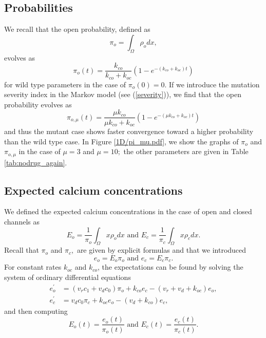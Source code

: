 \subsection{Probabilities}

We recall that the open probability, defined as
\begin{equation}
\pi_{o}=\int_{\Omega}\rho_{o}dx, \label{open100}
\end{equation}
evolves as%
\begin{equation}
\pi_{o}(t)=\frac{k_{co}}{k_{co}+k_{oc}}\left(  1-e^{-\left(  k_{co}%
+k_{oc}\right)  t}\right)
\end{equation}
for wild type parameters in the case of $\pi_{o}(0)=0$. If we introduce the mutation severity index in the
Markov model (see (\ref{severity})), we find that the open probability evolves as%
\begin{equation}
\pi_{o,\mu}(t)=\frac{\mu k_{co}}{\mu k_{co}+k_{oc}}\left(  1-e^{-\left(  \mu
k_{co}+k_{oc}\right)  t}\right)
\end{equation}
and thus the mutant case shows faster convergence toward a higher probability
than the wild type case. In Figure \ref{1D/pi_mu.pdf}, we show the graphs of $\pi_{o}$ and
$\pi_{o,\mu}$ in the case of $\mu=3$ and $\mu=10;$ the other parameters are given in Table \ref{tab:nodrug_again}.

\bigskip


\subsection{Expected calcium concentrations}

We defined the expected calcium concentrations in the case of open and
closed channels as
\begin{equation}
E_{o}=\frac{1}{\pi_{o}}\int_{\Omega}x\rho_{o}dx\text{ and }E_{c}=\frac{1}%
{\pi_{c}}\int_{\Omega}x\rho_{c}dx.
\end{equation}
Recall that $\pi_{o}$ and $\pi_{c},$ are given by explicit formulas
and that we introduced
\begin{equation}
e_{o}=E_{o}\pi_{o}\text{ and }e_{c}=E_{c}\pi_{c}. \label{eoec_def3}
\end{equation}
For constant rates $k_{oc}$ and $k_{co}$, the expectations can be found by solving
the system of ordinary differential equations%
\begin{align}
e_{o}^{\prime}  & =\left(  v_{r}c_{1}+v_{d}c_{0}\right)  \pi_{o}+k_{co}%
e_{c}-\left(  v_{r}+v_{d}+k_{oc}\right)  e_{o}, \label{eo3333}\\
e_{c}^{\prime}  & =v_{d}c_{0}\pi_{c}+k_{oc}e_{o}-\left(  v_{d}+k_{co}\right)
e_{c}, \label{ec3333}
\end{align}
and then computing
\[
E_o(t)=\frac{e_o(t)}{\pi_o(t)}\text{ and }
E_c(t)=\frac{e_c(t)}{\pi_c(t)}.
\]

